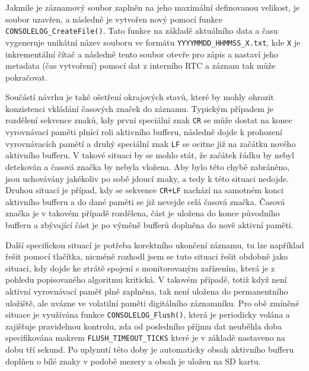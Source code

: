 Jakmile je záznamový soubor zaplněn na jeho maximální definovanou velikost, je soubor uzavřen, a následně je vytvořen nový pomocí funkce \texttt{CONSOLELOG\_CreateFile()}. Tato funkce na základě aktuálního data a času vygeneruje unikátní název souboru ve formátu \texttt{YYYYMMDD\_HHMMSS\_X.txt}, kde \texttt{X} je inkrementální čítač a následně tento soubor otevře pro zápis a nastaví jeho metadata (čas vytvoření) pomocí dat z interního RTC a záznam tak může pokračovat.

Součástí návrhu je také ošetření okrajových stavů, které by mohly ohrozit konzistenci vkládání časových značek do záznamu. Typickým případem je rozdělení sekvence znaků, kdy první speciální znak \texttt{CR} se může dostat na konec vyrovnávací paměti plnící roli aktivního bufferu, následně dojde k prohození vyrovnávacích pamětí a druhý speciální znak \texttt{LF} se ocitne již na začátku nového aktivního bufferu. V takové situaci by se mohlo stát, že začátek řádku by nebyl detekován a časová značka by nebyla vložena. Aby bylo této chybě zabráněno, jsou uchovávány jakékoliv po sobě jdoucí znaky, a tedy k této situaci nedojde. Druhou situací je případ, kdy se sekvence \texttt{CR+LF} nachází na samotném konci aktivního bufferu a do dané paměti se již nevejde celá časová značka. Časová značka je v takovém případě rozdělena, část je uložena do konce původního bufferu a zbývající část je po výměně bufferů doplněna do nově aktivní paměti.

Další specifickou situací je potřeba korektního ukončení záznamu, tu lze například řešit pomocí tlačítka, nicméně rozhodl jsem se tuto situaci řešit obdobně jako situaci, kdy dojde ke ztrátě spojení s monitorovaným zařízením, která je z pohledu popisovaného algoritmu kritická. V takovém případě, totiž když není aktivní vyrovnávací paměť plně zaplněna, tak není uložena do permanentního uložiště, ale uvázne ve volatilní paměti digitálního záznamníku. Pro obě zmíněné situace je využívána funkce \texttt{CONSOLELOG\_Flush()},  která je periodicky volána a zajišťuje pravidelnou kontrolu, zda od posledního příjmu dat neuběhla doba specifikována makrem \texttt{FLUSH\_TIMEOUT\_TICKS} které je v základě nastaveno na dobu tří sekund. Po uplynutí této doby je automaticky obsah aktivního bufferu doplňen o bílé znaky v podobě mezery a obsah je uložen na SD kartu.


